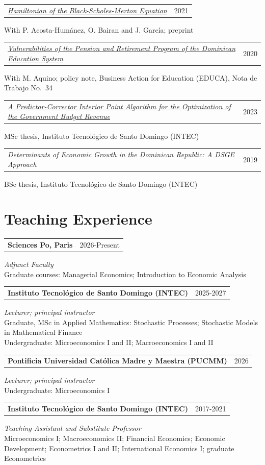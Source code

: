 \documentclass[a4paper,11pt]{article}
\makeatletter
\newcommand{\entry}[3]{%
  \begin{minipage}{\linewidth}
  \begin{tabularx}{\linewidth}{@{}>{\raggedright\arraybackslash}X@{\hspace{12pt}}r@{}}
  \textbf{#1}&{\small #2}\\
  \end{tabularx}\par
  #3\par\end{minipage}\par\vspace{6pt}}
\newcommand{\paper}[3]{%
  \begin{minipage}{\linewidth}
  \begin{tabularx}{\linewidth}{@{}>{\raggedright\arraybackslash}X@{\hspace{12pt}}r@{}}
  #1&{\small #2}\\
  \end{tabularx}\par
  {\small #3}\end{minipage}\par\vspace{6pt}}
\newcommand{\subhead}[1]{{\small\bfseries #1}\par\vspace{3pt}}
\makeatother
\begin{document}
\vspace{3pt}\subhead{Other Work}
\paper{\href{https://www.researchgate.net/publication/376391779_Hamiltonian_of_the_Black-Scholes-Merton_equation}{\textit{Hamiltonian of the Black-Scholes-Merton Equation}}}{2021}{With P. Acosta-Hum\'anez, O. Bairan and J. Garc\'ia; preprint}
\paper{\href{https://educa.org.do/2020/02/10/nota-de-trabajo-34-vulnerabilidades-del-programa-de-pensiones-y-jubilaciones-del-sistema-educativo-dominicano/}{\textit{Vulnerabilities of the Pension and Retirement Program of the Dominican Education System}}}{2020}{With M. Aquino; policy note, Business Action for Education (EDUCA), Nota de Trabajo No.\ 34}

\vspace{3pt}\subhead{Earlier Theses}
\paper{\href{https://www.researchgate.net/publication/384359271_A_Predictor-Corrector_Interior_Point_Algorithm_for_the_Optimization_of_the_Government_Budget_Revenue}{\textit{A Predictor-Corrector Interior Point Algorithm for the Optimization of the Government Budget Revenue}}}{2023}{MSc thesis, Instituto Tecnol\'ogico de Santo Domingo (INTEC)}
\paper{\textit{Determinants of Economic Growth in the Dominican Republic: A DSGE Approach}}{2019}{BSc thesis, Instituto Tecnol\'ogico de Santo Domingo (INTEC)}

\section{Teaching Experience}
\entry{Sciences Po, Paris}{2026-Present}{%
\textit{Adjunct Faculty}\\
Graduate courses: Managerial Economics; Introduction to Economic Analysis}
\entry{Instituto Tecnol\'ogico de Santo Domingo (INTEC)}{2025-2027}{%
\textit{Lecturer; principal instructor}\\
Graduate, MSc in Applied Mathematics: Stochastic Processes; Stochastic Models in Mathematical Finance\\
Undergraduate: Microeconomics I and II; Macroeconomics I and II}
\entry{Pontificia Universidad Cat\'olica Madre y Maestra (PUCMM)}{2026}{%
\textit{Lecturer; principal instructor}\\
Undergraduate: Microeconomics I}
\entry{Instituto Tecnol\'ogico de Santo Domingo (INTEC)}{2017-2021}{%
\textit{Teaching Assistant and Substitute Professor}\\
Microeconomics I; Macroeconomics II; Financial Economics; Economic Development; Econometrics I and II; International Economics I; graduate Econometrics}
\end{document}
